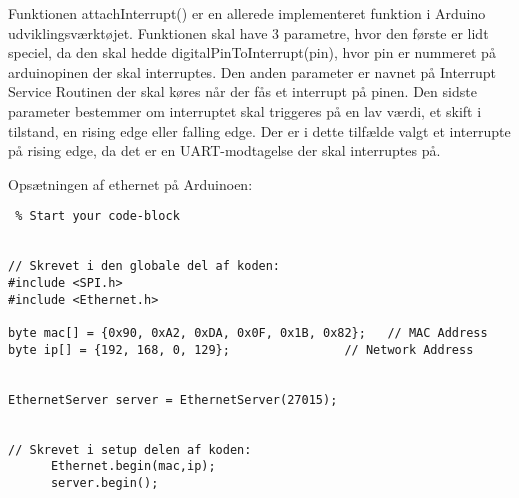 Funktionen attachInterrupt() er en allerede implementeret funktion i Arduino udviklingsværktøjet. Funktionen skal have 3 parametre, hvor den første er lidt speciel, da den skal hedde digitalPinToInterrupt(pin), hvor pin er nummeret på arduinopinen der skal interruptes. Den anden parameter er navnet på Interrupt Service Routinen der skal køres når der fås et interrupt på pinen. Den sidste parameter bestemmer om interruptet skal triggeres på en lav værdi, et skift i tilstand, en rising edge eller falling edge. Der er i dette tilfælde valgt et interrupte på rising edge, da det er en UART-modtagelse der skal interruptes på. 

Opsætningen af ethernet på Arduinoen: 


\begin{lstlisting} % Start your code-block


// Skrevet i den globale del af koden:
#include <SPI.h>
#include <Ethernet.h>

byte mac[] = {0x90, 0xA2, 0xDA, 0x0F, 0x1B, 0x82};   // MAC Address
byte ip[] = {192, 168, 0, 129};                // Network Address


EthernetServer server = EthernetServer(27015);


// Skrevet i setup delen af koden:
      Ethernet.begin(mac,ip);
      server.begin();



\end{lstlisting}
